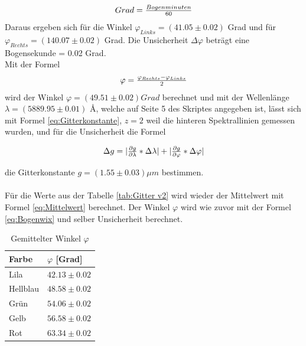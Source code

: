 \documentclass[12pt,a4paper,twoside]{article}
\begin{document}
\begin{equation}
    \label{eq:Bogenwix}
    \centerline{$Grad = \frac{Bogenminuten}{60}$}
\end{equation}
Daraus ergeben sich für die Winkel $\varphi_{Links} = (41.05 \pm 0.02)$ Grad und für $\varphi_{Rechts} = (140.07 \pm 0.02) $ Grad. Die Unsicherheit $\Delta \varphi $ beträgt eine Bogensekunde = 0.02 Grad. 
\\
Mit der Formel
\begin{equation}
    \label{eq:formel für gitterwix}
    \centerline{$\varphi = \frac{\varphi_{Rechts} - \varphi_{Links}}{2}$}
\end{equation}
wird der Winkel $\varphi = (49.51 \pm 0.02) Grad$ berechnet und mit der Wellenlänge $\lambda = (5889.95 \pm 0.01)$ \AA, welche auf Seite 5 des Skriptes \cite{teachcenter2} angegeben ist, lässt sich mit Formel \ref{eq:Gitterkonstante}, $z=2$ weil die hinteren Spektrallinien gemessen wurden, und für die Unsicherheit die Formel 

\begin{equation}
    \label{eq:uns gitterkonstante}
    \centerline{$ \Delta g = \vert \frac{\partial g}{\partial \lambda} * \Delta \lambda \vert + \vert \frac{\partial g}{\partial \varphi} * \Delta \varphi \vert$}
\end{equation}

\noindent
die Gitterkonstante $g = (1.55 \pm 0.03) \mu m$ bestimmen. 
\\
\\
Für die Werte aus der Tabelle \ref{tab:Gitter v2} wird wieder der Mittelwert mit Formel \ref{eq:Mittelwert} berechnet. 
Der Winkel $\varphi$ wird wie zuvor mit der Formel \ref{eq:Bogenwix} und selber Unsicherheit berechnet. 

\begin{table}[H]
    \centering
    \caption{Gemittelter Winkel $\varphi$}
    \label{tab:gitterwinkel}
    \begin{tabular}{| l | l |}
        \hline
        Farbe & $\varphi$ [Grad] \\
        \hline
        Lila        & $ 42.13 \pm 0.02 $ \\
        Hellblau    & $ 48.58 \pm 0.02 $ \\
        Grün        & $ 54.06 \pm 0.02 $ \\
        Gelb        & $ 56.58 \pm 0.02 $ \\
        Rot         & $ 63.34 \pm 0.02 $ \\
        \hline
    \end{tabular}
\end{table}
\end{document}
